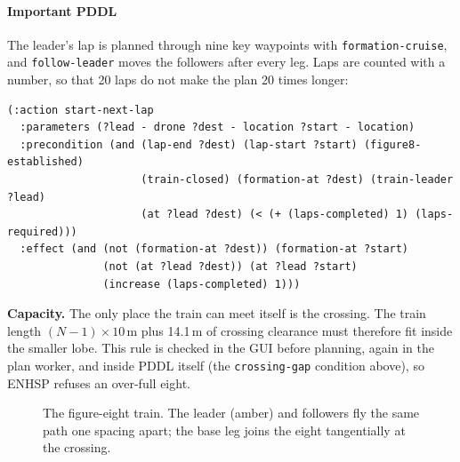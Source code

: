 \documentclass[11pt,a4paper,oneside]{report}
\newcommand{\code}[1]{\texttt{#1}}
\begin{document}
\paragraph{Important PDDL}
The leader's lap is planned through nine key waypoints with \code{formation-cruise}, and
\code{follow-leader} moves the followers after every leg. Laps are counted with a number, so
that 20 laps do not make the plan 20 times longer:

\begin{lstlisting}
(:action start-next-lap
  :parameters (?lead - drone ?dest - location ?start - location)
  :precondition (and (lap-end ?dest) (lap-start ?start) (figure8-established)
                     (train-closed) (formation-at ?dest) (train-leader ?lead)
                     (at ?lead ?dest) (< (+ (laps-completed) 1) (laps-required)))
  :effect (and (not (formation-at ?dest)) (formation-at ?start)
               (not (at ?lead ?dest)) (at ?lead ?start)
               (increase (laps-completed) 1)))
\end{lstlisting}

\noindent\textbf{Capacity.} The only place the train can meet itself is the crossing. The train
length $(N-1)\times10$\,m plus 14.1\,m of crossing clearance must therefore fit inside the
smaller lobe. This rule is checked in the GUI before planning, again in the plan worker, and
inside PDDL itself (the \code{crossing-gap} condition above), so ENHSP refuses an over-full
eight.

\begin{figure}[H]
\centering
{}
\caption[The figure-eight train]{The figure-eight train. The leader (amber) and followers fly the
same path one spacing apart; the base leg joins the eight tangentially at the crossing.}
\label{fig:fig8}
\end{figure}
\end{document}
